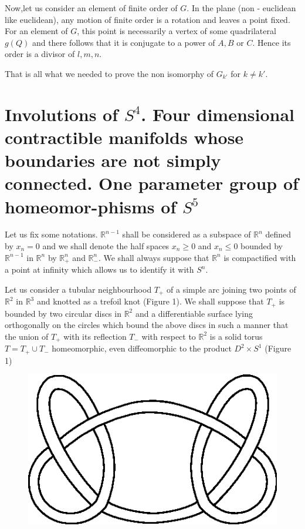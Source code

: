  Now,\pageoriginale let us consider an element of finite order of
 $G$. In the plane 
 (non - euclidean like euclidean), any motion of finite order is a
 rotation and leaves a point fixed. For an element of $G$, this point
 is necessarily a vertex of some quadrilateral $g(Q)$ and there follows
 that it is conjugate to a power of $A, B$ or $C$. Hence its order
 is a divisor of $l, m, n$.  
 
 That is all what  we needed to prove the non isomorphy of $G_{k'}$
 for $k \neq k'$. 

\section[Involutions of $S^4$.....]{Involutions of $S^4$. Four
  dimensional contractible 
  manifolds whose boundaries are not simply connected. One parameter
  group of homeomor-\break phisms of $S^5$}\label{sec9}\pageoriginale %

Let us fix some notations. $\mathbb{R}^{n-1}$ shall be considered as a
subspace of $\mathbb{R}^{n}$ defined by $x_n = 0$ and we shall denote
the half spaces $x_n \geq 0$ and $x_n \leq 0$ bounded by
$\mathbb{R}^{n-1}$ in $\mathbb{R}^{n}$ by $\mathbb{R}^{n}_+$ and
$\mathbb{R}^{n}_-$. We shall always suppose that $\mathbb{R}^{n}$ is
compactified with a point at infinity which allows us to identify it
with $S^n$.  

Let us consider a tubular neighbourhood $T_+$ of a simple arc joining
two points of $\mathbb{R}^{2}$ in $\mathbb{R}^{3}$ and knotted as a
trefoil knot (Figure 1). We shall suppose that $T_+$ is bounded by two
circular discs in $\mathbb{R}^{2}$ and a differentiable surface lying
orthogonally on the circles which bound the above discs in such a
manner that the union of $T_+$ with its reflection $T_-$ with respect to
$\mathbb{R}^{2}$ is a solid torus $T= T_+ \cup T_-$ homeomorphic, even
diffeomorphic to the product $D^2 \times S^1 $ (Figure 1) 
\begin{figure}[H]
\centering
\includegraphics{vol44-fig/fig44-18.eps}
\end{figure}


